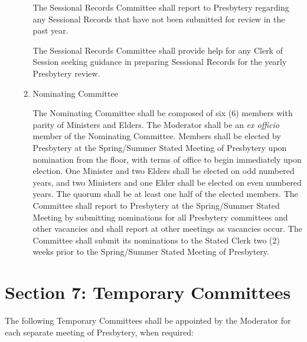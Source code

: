 \documentclass[
]{book}
\begin{document}
\begin{enumerate}
\begin{enumerate}
    The Sessional Records Committee shall report to Presbytery regarding any Sessional Records that have not been submitted for review in the past year.

    The Sessional Records Committee shall provide help for any Clerk of Session seeking guidance in preparing Sessional Records for the yearly Presbytery review.
  \item
    Nominating Committee

    The Nominating Committee shall be composed of six (6) members with parity of Ministers and Elders. The Moderator shall be an \emph{ex officio} member of the Nominating Committee. Members shall be elected by Presbytery at the Spring/Summer Stated Meeting of Presbytery upon nomination from the floor, with terms of office to begin immediately upon election. One Minister and two Elders shall be elected on odd numbered years, and two Ministers and one Elder shall be elected on even numbered years. The quorum shall be at least one half of the elected members. The Committee shall report to Presbytery at the Spring/Summer Stated Meeting by submitting nominations for all Presbytery committees and other vacancies and shall report at other meetings as vacancies occur. The Committee shall submit its nominations to the Stated Clerk two (2) weeks prior to the Spring/Summer Stated Meeting of Presbytery.
  \end{enumerate}
\end{enumerate}

\hypertarget{section-7-temporary-committees}{%
\section*{Section 7: Temporary Committees}\label{section-7-temporary-committees}}

The following Temporary Committees shall be appointed by the Moderator for each separate meeting of Presbytery, when required:
\end{document}
